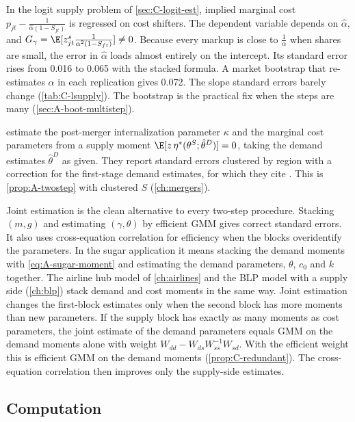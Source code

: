 In the logit supply problem of \cref{sec:C-logit-est}, implied marginal cost $p_{jt} - \frac{1}{\hat\alpha(1 - S_{ft})}$ is
regressed on cost shifters. The dependent variable depends on $\hat\alpha$, and
$G_\gamma = \E[z^s_{jt}\frac{1}{\alpha^2(1 - S_{ft})}] \ne 0$. Because every markup is close to $\frac{1}{\alpha}$ when shares
are small, the error in $\hat\alpha$ loads almost entirely on the intercept. Its standard error rises from 0.016 to 0.065
with the stacked formula. A market bootstrap that re-estimates $\alpha$ in each replication gives 0.072. The slope
standard errors barely change (\cref{tab:C-lsupply}). The bootstrap is the practical fix when the steps are many
(\cref{sec:A-boot-multistep}).

\citet[p.~1780]{MillerWeinberg2017} estimate the post-merger internalization parameter $\kappa$ and the marginal cost parameters
from a supply moment $\E[z\,\eta^*(\theta^S;\hat\theta^D)] = 0$, taking the demand estimates $\hat\theta^D$ as given. They
report standard errors clustered by region with a correction for the first-stage demand estimates, for which they
cite \citet{Wooldridge2010}.
This is \cref{prop:A-twostep} with clustered $S$ (\cref{ch:mergers}).

Joint estimation is the clean alternative to every two-step procedure. Stacking $(m, g)$ and estimating $(\gamma, \theta)$
by efficient GMM gives correct standard errors. It also uses cross-equation correlation for efficiency when the blocks
overidentify the parameters. In the sugar
application it means stacking the demand moments with \eqref{eq:A-sugar-moment} and estimating the demand parameters,
$\theta$, $c_0$ and $k$ together. The airline hub model of \cref{ch:airlines} and the BLP model with a supply side
(\cref{ch:blp}) stack demand and cost moments in the same way. Joint estimation changes the first-block estimates only
when the second block has more moments than new parameters. If the supply block has exactly as many moments as cost
parameters, the joint estimate of the demand parameters equals GMM on the demand moments alone with weight
$W_{dd} - W_{ds}W_{ss}^{-1}W_{sd}$. With the efficient weight this is efficient GMM on the demand moments
(\cref{prop:C-redundant}). The cross-equation correlation then improves only the supply-side estimates.

\subsection{Computation}\label{sec:A-gmm-computation}

